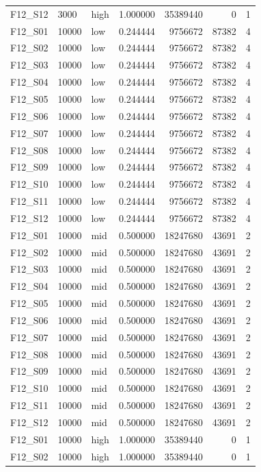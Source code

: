 \begin{longtable}{lllr r r r}
F12\_S12 & 3000 & high & 1.000000 & 35389440 & 0 & 1 \\
F12\_S01 & 10000 & low & 0.244444 & 9756672 & 87382 & 4 \\
F12\_S02 & 10000 & low & 0.244444 & 9756672 & 87382 & 4 \\
F12\_S03 & 10000 & low & 0.244444 & 9756672 & 87382 & 4 \\
F12\_S04 & 10000 & low & 0.244444 & 9756672 & 87382 & 4 \\
F12\_S05 & 10000 & low & 0.244444 & 9756672 & 87382 & 4 \\
F12\_S06 & 10000 & low & 0.244444 & 9756672 & 87382 & 4 \\
F12\_S07 & 10000 & low & 0.244444 & 9756672 & 87382 & 4 \\
F12\_S08 & 10000 & low & 0.244444 & 9756672 & 87382 & 4 \\
F12\_S09 & 10000 & low & 0.244444 & 9756672 & 87382 & 4 \\
F12\_S10 & 10000 & low & 0.244444 & 9756672 & 87382 & 4 \\
F12\_S11 & 10000 & low & 0.244444 & 9756672 & 87382 & 4 \\
F12\_S12 & 10000 & low & 0.244444 & 9756672 & 87382 & 4 \\
F12\_S01 & 10000 & mid & 0.500000 & 18247680 & 43691 & 2 \\
F12\_S02 & 10000 & mid & 0.500000 & 18247680 & 43691 & 2 \\
F12\_S03 & 10000 & mid & 0.500000 & 18247680 & 43691 & 2 \\
F12\_S04 & 10000 & mid & 0.500000 & 18247680 & 43691 & 2 \\
F12\_S05 & 10000 & mid & 0.500000 & 18247680 & 43691 & 2 \\
F12\_S06 & 10000 & mid & 0.500000 & 18247680 & 43691 & 2 \\
F12\_S07 & 10000 & mid & 0.500000 & 18247680 & 43691 & 2 \\
F12\_S08 & 10000 & mid & 0.500000 & 18247680 & 43691 & 2 \\
F12\_S09 & 10000 & mid & 0.500000 & 18247680 & 43691 & 2 \\
F12\_S10 & 10000 & mid & 0.500000 & 18247680 & 43691 & 2 \\
F12\_S11 & 10000 & mid & 0.500000 & 18247680 & 43691 & 2 \\
F12\_S12 & 10000 & mid & 0.500000 & 18247680 & 43691 & 2 \\
F12\_S01 & 10000 & high & 1.000000 & 35389440 & 0 & 1 \\
F12\_S02 & 10000 & high & 1.000000 & 35389440 & 0 & 1 \\

\end{longtable}
